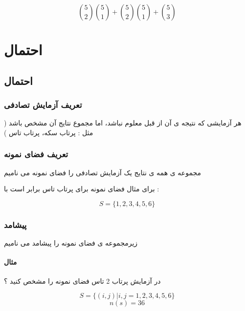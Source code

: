\documentclass[12pt]{book}
\begin{document}


$$
\binom{5}{2} \binom{5}{1} + \binom{5}{2} \binom{5}{1} + \binom{5}{3}
$$


\chapter{احتمال}

\section{احتمال}

\subsection{تعریف آزمایش تصادفی}

هر آزمایشی که نتیجه ی آن از قبل معلوم نباشد، اما مجموع نتایج آن مشخص باشد ( مثل : پرتاب سکه، پرتاب تاس )

\subsection{تعریف فضای نمونه}
مجموعه ی همه ی نتایج یک آزمایش تصادفی را فضای نمونه می نامیم

برای مثال فضای نمونه برای پرتاب تاس برابر است با :

$$
S = \{ 1 , 2 , 3 , 4 , 5 , 6 \}
$$

\subsection{پیشامد}
زیرمجموعه ی فضای نمونه را پیشامد می نامیم

\subsubsection{مثال}
در آزمایش پرتاب 2 تاس فضای نمونه را مشخص کنید ؟

$$
S = \{ ( i, j ) | i , j = 1, 2, 3, 4, 5, 6 \}
$$
$$
n(s) = 36
$$
\end{document}
